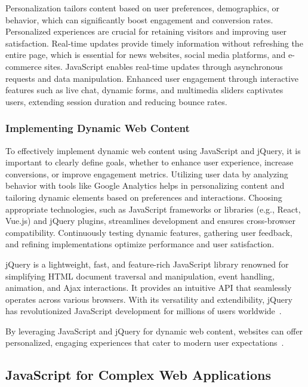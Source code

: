 \documentclass[conference]{IEEEtran}
\begin{document}
Personalization tailors content based on user preferences, demographics, or behavior, which can significantly boost engagement and conversion rates. Personalized experiences are crucial for retaining visitors and improving user satisfaction. Real-time updates provide timely information without refreshing the entire page, which is essential for news websites, social media platforms, and e-commerce sites. JavaScript enables real-time updates through asynchronous requests and data manipulation. Enhanced user engagement through interactive features such as live chat, dynamic forms, and multimedia sliders captivates users, extending session duration and reducing bounce rates.

\subsubsection{Implementing Dynamic Web Content}

To effectively implement dynamic web content using JavaScript and jQuery, it is important to clearly define goals, whether to enhance user experience, increase conversions, or improve engagement metrics. Utilizing user data by analyzing behavior with tools like Google Analytics helps in personalizing content and tailoring dynamic elements based on preferences and interactions. Choosing appropriate technologies, such as JavaScript frameworks or libraries (e.g., React, Vue.js) and jQuery plugins, streamlines development and ensures cross-browser compatibility. Continuously testing dynamic features, gathering user feedback, and refining implementations optimize performance and user satisfaction.

jQuery is a lightweight, fast, and feature-rich JavaScript library renowned for simplifying HTML document traversal and manipulation, event handling, animation, and Ajax interactions. It provides an intuitive API that seamlessly operates across various browsers. With its versatility and extendibility, jQuery has revolutionized JavaScript development for millions of users worldwide~\cite{jquery_history}.

By leveraging JavaScript and jQuery for dynamic web content, websites can offer personalized, engaging experiences that cater to modern user expectations~\cite{moldstud2024}.

\subsection{JavaScript for Complex Web Applications}
\end{document}
